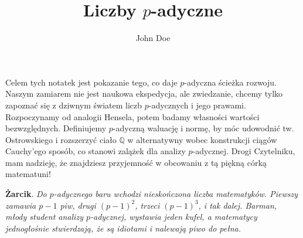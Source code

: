 \documentclass[a4paper,fleqn,9pt]{extarticle}
\title{\textbf{Liczby $p$-adyczne}}
\author{John Doe}
\begin{document}
\maketitle

Celem tych notatek jest pokazanie tego, co daje $p$-adyczna ścieżka rozwoju.
Naszym zamiarem nie jest naukowa ekspedycja, ale zwiedzanie, chcemy tylko zapoznać się z dziwnym światem liczb $p$-adycznych i jego prawami.
Rozpoczynamy od analogii Hensela, potem badamy własności wartości bezwzględnych.
Definiujemy $p$-adyczną waluację i normę, by móc udowodnić tw. Ostrowskiego i rozszerzyć ciało $\mathbb Q$ w alternatywny wobec konstrukcji ciągów Cauchy'ego sposób, co stanowi zalążek dla analizy $p$-adycznej.
Drogi Czytelniku, mam nadzieję, że znajdziesz przyjemność w obcowaniu z tą piękną córką matematuni!


\textbf{Żarcik}.
\emph{Do $p$-adycznego baru wchodzi nieskończona liczba matematyków.
Piewszy zamawia $p-1$ piw, drugi $(p-1)^2$, trzeci $(p-1)^3$, i tak dalej.
Barman, młody student analizy $p$-adycznej, wystawia jeden kufel, a matematycy jednogłośnie stwierdzają, że są idiotami i nalewają piwo do pełna.}

\end{document}
